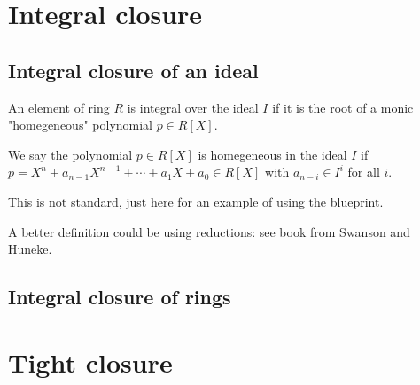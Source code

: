 %

\chapter{Integral closure}

\section{Integral closure of an ideal}

\begin{definition}[isIntegralElement]\label{defn:isIntegralElement}
    \leanok
    An element of ring $R$ is integral over the ideal $I$ if it is the root of a monic "homegeneous" 
    polynomial $p\in R[X]$.
\end{definition}

\begin{definition}[homogeneous]\label{defn:homogeneous}
    \leanok
    We say the polynomial $p\in R[X]$ is homegeneous in the ideal $I$ if
    $p = X^n + a_{n-1}X^{n-1} + \cdots + a_1 X + a_0\in R[X]$ with $a_{n-i} \in I^i$ for all $i$.

    This is not standard, just here for an example of using the blueprint.
\end{definition}

A better definition could be using reductions: see book from Swanson and Huneke.

\section{Integral closure of rings}

\chapter{Tight closure}
